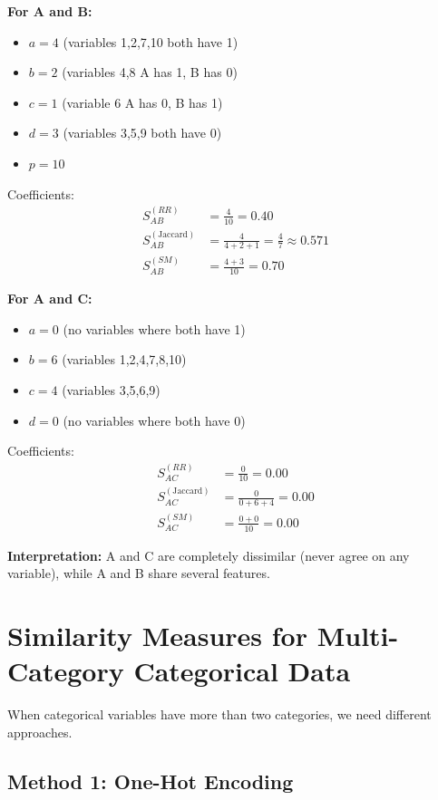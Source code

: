 \documentclass[11pt]{article}
\begin{document}
\textbf{For A and B:}
\begin{itemize}
    \item $a = 4$ (variables 1,2,7,10 both have 1)
    \item $b = 2$ (variables 4,8 A has 1, B has 0)
    \item $c = 1$ (variable 6 A has 0, B has 1)
    \item $d = 3$ (variables 3,5,9 both have 0)
    \item $p = 10$
\end{itemize}

Coefficients:
\begin{align*}
S_{AB}^{(RR)} &= \frac{4}{10} = 0.40 \\
S_{AB}^{(\text{Jaccard})} &= \frac{4}{4+2+1} = \frac{4}{7} \approx 0.571 \\
S_{AB}^{(SM)} &= \frac{4+3}{10} = 0.70
\end{align*}

\textbf{For A and C:}
\begin{itemize}
    \item $a = 0$ (no variables where both have 1)
    \item $b = 6$ (variables 1,2,4,7,8,10)
    \item $c = 4$ (variables 3,5,6,9)
    \item $d = 0$ (no variables where both have 0)
\end{itemize}

Coefficients:
\begin{align*}
S_{AC}^{(RR)} &= \frac{0}{10} = 0.00 \\
S_{AC}^{(\text{Jaccard})} &= \frac{0}{0+6+4} = 0.00 \\
S_{AC}^{(SM)} &= \frac{0+0}{10} = 0.00
\end{align*}

\textbf{Interpretation:} A and C are completely dissimilar (never agree on any variable), while A and B share several features.

\section{Similarity Measures for Multi-Category Categorical Data}

When categorical variables have more than two categories, we need different approaches.

\subsection{Method 1: One-Hot Encoding}
\end{document}
